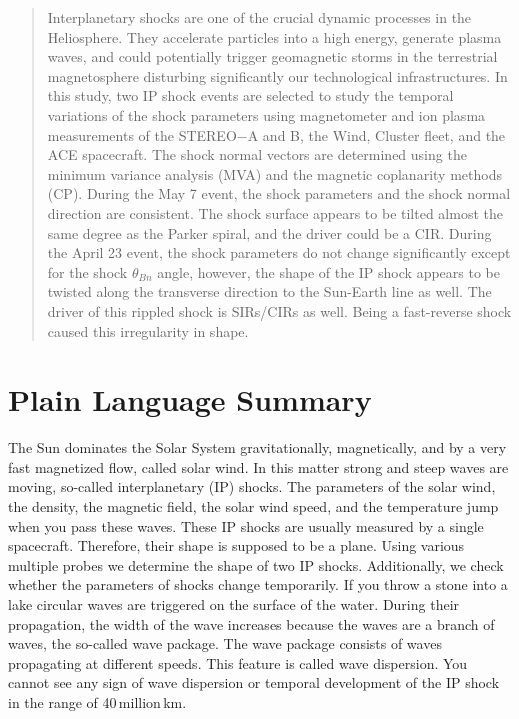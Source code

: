 \documentclass[draft]{agujournal2019}
\begin{document}
\begin{abstract}
 Interplanetary shocks are one of the crucial dynamic processes in the Heliosphere. They accelerate particles into a high energy, generate plasma waves, and could potentially trigger geomagnetic storms in the terrestrial magnetosphere disturbing significantly our technological infrastructures. In this study, two IP shock events are selected to study the temporal variations of the shock parameters using magnetometer and ion plasma measurements of the STEREO$-$A and B, the Wind, Cluster fleet, and the ACE spacecraft. The shock normal vectors are determined using the minimum variance analysis (MVA) and the magnetic coplanarity methods (CP). During the May 7 event, the shock parameters and the shock normal direction are consistent. The shock surface appears to be tilted almost the same degree as the Parker spiral, and the driver could be a CIR. During the April 23 event, the shock parameters do not change significantly except for the shock $\theta_{Bn}$ angle, however, the shape of the IP shock appears to be twisted along the transverse direction to the Sun-Earth line as well. The driver of this rippled shock is SIRs/CIRs as well. Being a fast-reverse shock caused this irregularity in shape.
\end{abstract}


\section*{Plain Language Summary}
The Sun dominates the Solar System gravitationally, magnetically, and by a very fast magnetized flow, called solar wind. In this matter strong and steep waves are moving, so-called interplanetary (IP) shocks. The parameters of the solar wind, the density, the magnetic field, the solar wind speed, and the temperature jump when you pass these waves. These IP shocks are usually measured by a single spacecraft. Therefore, their shape is supposed to be a plane. Using various multiple probes we determine the shape of two IP shocks. Additionally, we check whether the parameters of shocks change temporarily. If you throw a stone into a lake circular waves are triggered on the surface of the water. During their propagation, the width of the wave increases because the waves are a branch of waves, the so-called wave package. The wave package consists of waves propagating at different speeds. This feature is called wave dispersion. You cannot see any sign of wave dispersion or temporal development of the IP shock in the range of 40\,million\,km. 
\end{document}
